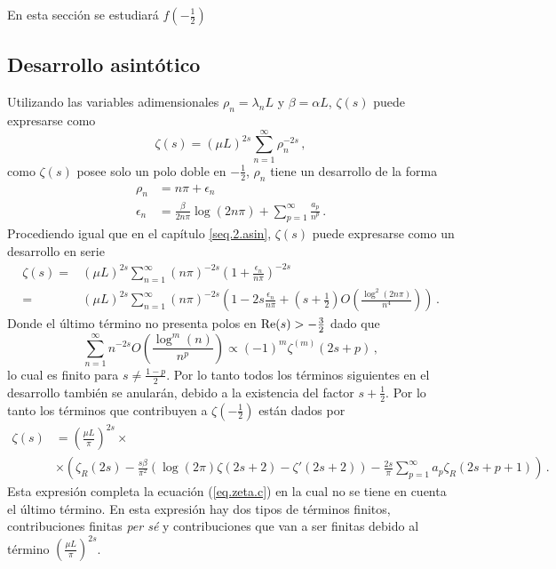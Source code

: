 En esta sección se estudiará $ f \left( - \frac{1}{2} \right)$

\subsection{Desarrollo asintótico}

Utilizando las variables adimensionales $\rho _n = \lambda _n L$ y $\beta = \alpha L$, $\zeta (s)$ puede expresarse como
\begin{equation}
\zeta (s) = \left( \mu L \right) ^{2s} \sum _{n=1} ^{\infty} \rho _n ^{-2s} 
\, ,
\end{equation}
como $\zeta (s)$ posee solo un polo doble en $-\frac{1}{2}$, $\rho _n$ tiene un desarrollo de la forma
\begin{equation}
\begin{aligned}
\rho _n  &= 
			n \pi + \epsilon _n \\
			\epsilon _n &= 
			\frac{ \beta }{2 n \pi } \log (2 n \pi) +
			\sum _{p=1} ^{\infty} \frac{a _p}{n ^p }
			\, .
\end{aligned}
\end{equation}
Procediendo igual que en el capítulo \ref{seq.2.asin}, $\zeta (s)$ puede expresarse como un desarrollo en serie
\begin{equation}
\begin{aligned}
\zeta (s) =& 
( \mu L ) ^{2s}
\sum _{n=1} ^{\infty}
( n \pi) ^{-2s} \left( 1 + \frac{ \epsilon _n }{n \pi } \right) ^{-2s } \\
 =& 
(\mu L) ^{2s} \sum _{n=1} ^{\infty}
( n \pi) ^{-2s} \left(
						1 -2s  \frac{\epsilon _n}{n \pi} + 
						\left( s + \frac{1}{2} \right) 
						O \left( \frac{ \log ^2 ( 2 n \pi ) }{ n ^4} \right)  
						\right)
\, .
\end{aligned}
\end{equation}
Donde el último término no presenta polos en \mbox{${\rm Re}(s) >- \frac{3}{2}$} dado que
\begin{equation} 
	\sum _{n=1} ^{\infty}
	 n  ^{-2s} O \left( \frac{ \log ^m (n)}{ n ^p} \right)
	\propto 
		(-1) ^m \zeta ^{(m)} (2s+p) 
\, ,
\end{equation}
lo cual es finito para $s \neq \frac{1-p}{2}$.
Por lo tanto todos los términos siguientes en el desarrollo también se anularán, debido a la existencia del factor $s + \frac{1}{2}$.
Por lo tanto los términos que contribuyen a $\zeta \left( - \frac{1}{2} \right)$ están dados por
\begin{align}
\zeta (s) &= \left( \frac{\mu L}{\pi} \right) ^{2s} \times \\
			\nonumber
			&\times
			\left(
					\zeta _R (2s) - \frac{s \beta}{\pi ^2} 
						\left(
							\log (2 \pi ) \zeta (2s+2) - \zeta '(2s+2)
							\right)-
					\frac{2 s}{\pi} \sum _{p=1} ^{\infty}
						a _p \zeta _R (2s+p+1)
					\right)
\, .					
\end{align}
Esta expresión completa la ecuación (\ref{eq.zeta.c}) en la cual no se tiene en cuenta el último término.
En esta expresión hay dos tipos de términos finitos, contribuciones finitas {\it per sé} y contribuciones que van a ser finitas debido al término $ \left( \frac{\mu L}{\pi}\right) ^{2s}$.


